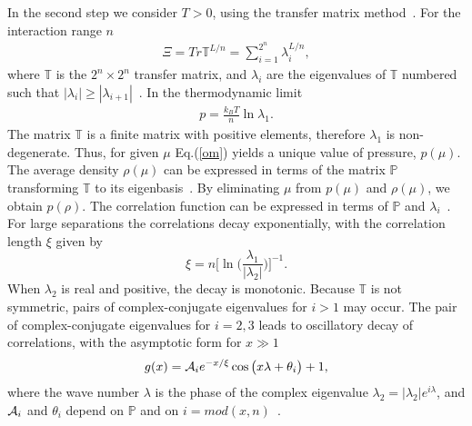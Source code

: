 \documentclass[preprint,
prl,%
aps]{revtex4}
\begin{document}
 
 In the second step we consider $T>0$, using 
the transfer matrix method~\cite{pekalski:13:0}.
For the interaction range $n$
\begin{eqnarray}
\label{Xila}
 \Xi=Tr {\mathbb T}^{L/n} =\sum_{i=1}^{2^n}\lambda_i^{L/n},
\end{eqnarray}
where $\mathbb T$ is the  $2^n\times 2^n$
transfer matrix, and $\lambda_i$ are the eigenvalues of  $\mathbb T$ numbered such that 
$|\lambda_i|\ge|\lambda_{i+1}|$~\cite{pekalski:13:0}.
In the thermodynamic limit 
\begin{eqnarray}
\label{om}
 p=
 \frac{k_B T}{n}\ln \lambda_1.
\end{eqnarray}
 The matrix $\mathbb T$ is a finite matrix with positive elements,
 therefore $\lambda_1$ is non-degenerate. 
Thus,  for given $\mu$  Eq.(\ref{om}) yields a unique value of pressure, $p(\mu)$.
The average density $\rho(\mu)$ can be expressed in terms of 
the matrix $\mathbb P$ transforming  $\mathbb T$
to its eigenbasis~\cite{pekalski:13:0}. By eliminating $\mu$ from   $p(\mu)$ and $\rho(\mu)$, we obtain $p(\rho)$. 
%
The correlation function can be expressed in terms of
$\mathbb P$ and $\lambda_i$~\cite{pekalski:13:0}.
For large separations the correlations decay exponentially, with the 
 correlation length $\xi$ given by~\cite{pekalski:13:0}
\begin{equation}
\label{xi}
 \xi=n\Bigg[\ln \Big(\frac{\lambda_1}{|\lambda_2|}\Big)\Bigg]^{-1}.
\end{equation}
When $\lambda_2$ is real and positive, the decay is monotonic.
Because $\mathbb T$  is not symmetric,  
 pairs of complex-conjugate eigenvalues for $i>1$  may occur.  
The pair of complex-conjugate eigenvalues for $i=2,3$  leads to oscillatory
decay of correlations, with  the asymptotic form  for $x\gg 1$ 
\begin{eqnarray}
\label{corr1}
  g(x)= {\cal A}_i e^{-x/\xi}\cos\big(
x\lambda +\theta_i
\big) +1,
\end{eqnarray}
where the wave number $\lambda$ is the phase of the complex eigenvalue $\lambda_2=|\lambda_2|e^{i\lambda}$,
and   ${\cal A}_i$ and  $\theta_i$ 
depend on  $\mathbb P$
and on $i=mod(x, n)$~\cite{pekalski:13:0}. 
\end{document}
